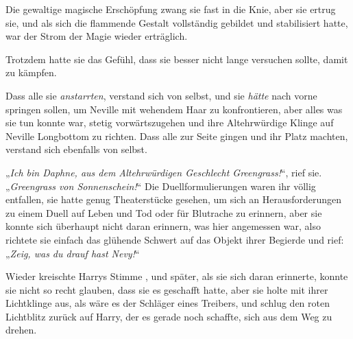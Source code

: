 Die gewaltige magische Erschöpfung zwang sie fast in die Knie, aber sie ertrug sie, und als sich die flammende Gestalt vollständig gebildet und stabilisiert hatte, war der Strom der Magie wieder erträglich.

Trotzdem hatte sie das Gefühl, dass sie besser nicht lange versuchen sollte, damit zu kämpfen.

Dass alle sie \emph{anstarrten}, verstand sich von selbst, und sie \emph{hätte} nach vorne springen sollen, um Neville mit wehendem Haar zu konfrontieren, aber alles was sie tun konnte war, stetig vorwärtszugehen und ihre Altehrwürdige Klinge auf Neville Longbottom zu richten. Dass alle zur Seite gingen und ihr Platz machten, verstand sich ebenfalls von selbst.

„\emph{Ich bin Daphne, aus dem Altehrwürdigen Geschlecht Greengrass!}“, rief sie.
„\emph{Greengrass von Sonnenschein!}“ Die Duellformulierungen waren ihr völlig entfallen, sie hatte genug Theaterstücke gesehen, um sich an Herausforderungen zu einem Duell auf Leben und Tod oder für Blutrache zu erinnern, aber sie konnte sich überhaupt nicht daran erinnern, was hier angemessen war, also richtete sie einfach das glühende Schwert auf das Objekt ihrer Begierde und rief:
„\emph{Zeig, was du drauf hast Nevy!}“

Wieder kreischte Harrys Stimme , und später, als sie sich daran erinnerte, konnte sie nicht so recht glauben, dass sie es geschafft hatte, aber sie holte mit ihrer Lichtklinge aus, als wäre es der Schläger eines Treibers, und schlug den roten Lichtblitz zurück auf Harry, der es gerade noch schaffte, sich aus dem Weg zu drehen.

